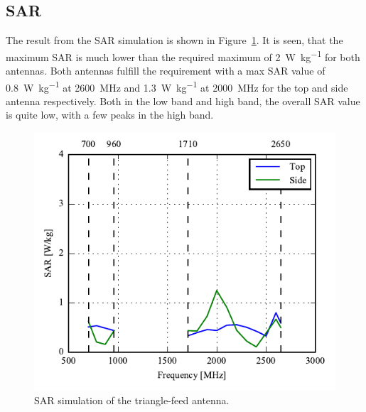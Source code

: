 \FloatBarrier
\subsection{SAR}%
The result from the SAR simulation is shown in Figure~\ref{fig:triang_sar_sim}. It is seen, that the maximum SAR is much lower than the required maximum of \SI{2}{W\per kg} for both antennas. Both antennas fulfill the requirement with a max SAR value of \SI{0.8}{W\per kg} at \SI{2600}{MHz} and \SI{1.3}{W\per kg} at \SI{2000}{MHz} for the top and side antenna respectively.   
Both in the low band and high band, the overall SAR value is quite low, with a few peaks in the high band.

\begin{figure}[htbp]
    \centering
    \includegraphics{img/tech_sol/trianglefeed/sar/sar.pdf}
    \caption{SAR simulation of the triangle-feed antenna.}
    \label{fig:triang_sar_sim}
\end{figure}
